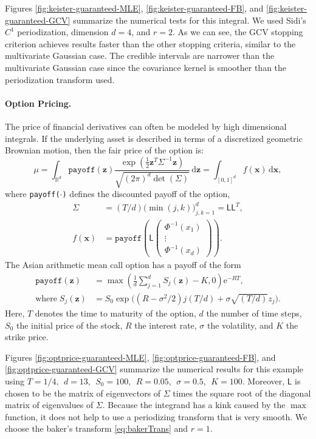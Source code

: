 \documentclass{svjour3}                     %
\newcommand{\bm}[1]{\boldsymbol{#1}}
\newcommand{\mSigma}{\mathsf{\Sigma}}
\newcommand{\dif}[1]{\text{d}{#1}}
\newcommand{\reals}{\mathbb{R}}
\newcommand{\vx}{\bm{x}}
\newcommand{\dvx}{\dif{\bm{x}}}
\newcommand{\vz}{\bm{z}}
\newcommand{\dvz}{\dif{\bm{z}}}
\newcommand{\mL}{\mathsf{L}}
\newcommand{\me}{\mathrm{e}}
\newcommand{\code}[1]{\texttt{#1}}
\begin{document}
Figures \ref{fig:keister-guaranteed-MLE}, \ref{fig:keister-guaranteed-FB}, and \ref{fig:keister-guaranteed-GCV} summarize the numerical tests for this integral.  We used Sidi's $C^1$ periodization, dimension $d=4$, and $r=2$. 
As we can see, the GCV stopping criterion achieves results faster than the other stopping criteria, similar to the multivariate Gaussian case. The credible intervals are narrower than the multivariate Gaussian case since the covariance kernel is smoother than the periodization transform used.

\paragraph{Option Pricing.}

The price of financial derivatives can often be modeled by high dimensional integrals. If the underlying asset is described in terms of a discretized geometric Brownian motion, then the fair price of the option is:
\begin{equation*}
\mu = \int_{\reals^d} \code{payoff}(\vz) \frac{\exp(\frac 12 \vz^T\mSigma^{-1}\vz)}{\sqrt{(2\pi)^d \det(\mSigma)}} \, \dvz = \int_{[0,1]^d} f(\vx) \, \dvx,
\end{equation*} 
where \code{payoff($\cdot$)} defines the discounted payoff of the option,
\begin{align*}
\mSigma &= (T/d) \bigl(\min(j,k) \bigr)_{j,k=1}^d = \mL \mL^T,\\
f(\vx) &= \code{payoff} \left(\mL 
\begin{pmatrix}
\Phi^{-1}(x_1) \\ \vdots \\ \Phi^{-1}(x_d)
\end{pmatrix} \right).
\end{align*}
The Asian arithmetic mean call option has a payoff of the form
\begin{align*}
\code{payoff}(\vz) &= \max\left( \frac 1d  \sum_{j=1}^d S_j(\vz) - K, 0 \right) \me^{-R T}, \\
\text{where}\;
S_j(\vz) &= S_0 \exp\bigl((R-\sigma^2/2)j(T/d) + \sigma \sqrt{(T/d)} z_j \bigr).
\end{align*}
Here, $T$ denotes the time to maturity of the option, $d$ the number of time steps, $S_0$ the initial price of the stock, $R$ the interest rate, $\sigma$ the volatility, and $K$ the strike price.  

Figures \ref{fig:optprice-guaranteed-MLE}, \ref{fig:optprice-guaranteed-FB}, and 
\ref{fig:optprice-guaranteed-GCV} summarize the numerical results for this example using
$
T = 1/4, \ \ d = 13, \ \ S_0 = 100, \ \ R =  0.05, \ \ \sigma = 0.5, \ \ K = 100.
$
Moreover, $\mL$ is chosen to be the matrix of eigenvectors of $\mSigma$ times the square root of the diagonal matrix of eigenvalues of $\mSigma$. 
Because the integrand has a kink caused by the $\max$ function, it does not help to use a periodizing transform that is very smooth.  We choose the baker's transform \eqref{eq:bakerTrans} and $r = 1$.
\end{document}
